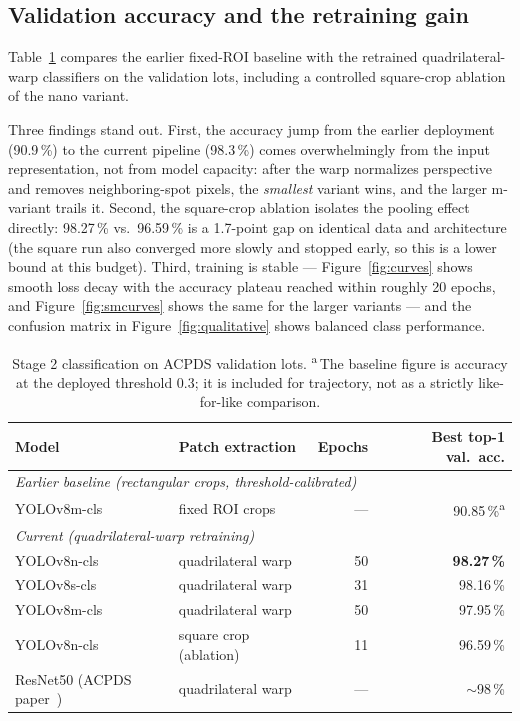 \documentclass[10pt,twocolumn,letterpaper]{article}
\begin{document}
\subsection{Validation accuracy and the retraining gain}
\label{sec:results}

Table~\ref{tab:results} compares the earlier fixed-ROI baseline with the
retrained quadrilateral-warp classifiers on the validation lots, including
a controlled square-crop ablation of the nano variant.

Three findings stand out. First, the accuracy jump from the earlier
deployment (90.9\,\%) to the current pipeline (98.3\,\%) comes
overwhelmingly from the input representation, not from model capacity:
after the warp normalizes perspective and removes neighboring-spot
pixels, the \emph{smallest} variant wins, and the larger m-variant trails
it. Second, the square-crop ablation isolates the pooling effect directly:
98.27\,\% vs.\ 96.59\,\% is a 1.7-point gap on identical data and
architecture (the square run also converged more slowly and stopped early,
so this is a lower bound at this budget). Third, training is stable ---
Figure~\ref{fig:curves} shows smooth loss decay with the accuracy plateau
reached within roughly 20 epochs, and Figure~\ref{fig:smcurves} shows the
same for the larger variants --- and the confusion matrix in
Figure~\ref{fig:qualitative} shows balanced class performance.

\begin{table}[tp]
\centering
\begin{tabular}{llrr}
\toprule
\textbf{Model} & \textbf{Patch extraction} & \textbf{Epochs} &
\textbf{Best top-1 val.\ acc.} \\
\midrule
\multicolumn{4}{l}{\emph{Earlier baseline (rectangular crops, threshold-calibrated)}} \\
YOLOv8m-cls & fixed ROI crops & --- & 90.85\,\%\textsuperscript{a} \\
\midrule
\multicolumn{4}{l}{\emph{Current (quadrilateral-warp retraining)}} \\
YOLOv8n-cls & quadrilateral warp & 50 & \textbf{98.27\,\%} \\
YOLOv8s-cls & quadrilateral warp & 31 & 98.16\,\% \\
YOLOv8m-cls & quadrilateral warp & 50 & 97.95\,\% \\
YOLOv8n-cls & square crop (ablation) & 11 & 96.59\,\% \\
\midrule
ResNet50 (ACPDS paper~\cite{marek2021imagebased}) & quadrilateral warp & --- & $\sim$98\,\% \\
\bottomrule
\end{tabular}
\caption{Stage 2 classification on ACPDS validation lots.
\textsuperscript{a}\,The baseline figure is accuracy at the deployed
threshold 0.3; it is included for trajectory, not as a strictly
like-for-like comparison.}
\label{tab:results}
\end{table}
\end{document}
